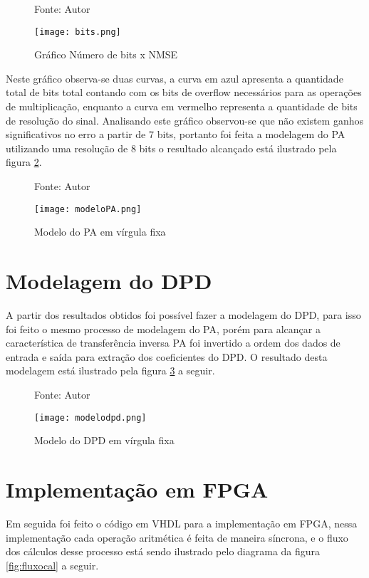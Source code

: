 \begin{figure}[htbp!]
    \centering
    \captionsetup{justification=centering}
    \caption*{Fonte: Autor}
    \texttt{[image: bits.png]}
    \caption{Gráfico Número de bits x NMSE}
    \label{fig:bits}
\end{figure}

Neste gráfico observa-se duas curvas, a curva em azul apresenta a quantidade total de bits total contando com os bits de overflow necessários para as operações de multiplicação, enquanto a curva em vermelho representa a quantidade de bits de resolução do sinal. Analisando este gráfico observou-se que não existem ganhos significativos no erro a partir de 7 bits, portanto foi feita a modelagem do PA utilizando uma resolução de 8 bits o resultado alcançado está ilustrado pela figura \ref{fig:modelopa}.

\begin{figure}[htbp!]
    \centering
    \captionsetup{justification=centering}
    \caption*{Fonte: Autor}
    \texttt{[image: modeloPA.png]}
    \caption{Modelo do PA em vírgula fixa}
    \label{fig:modelopa}
\end{figure}

\section{Modelagem do DPD}
A partir dos resultados obtidos foi possível fazer a modelagem do DPD, para isso foi feito o mesmo processo de modelagem do PA, porém para alcançar a característica de transferência inversa PA foi invertido a ordem dos dados de entrada e saída para extração dos coeficientes do DPD. O resultado desta modelagem está ilustrado pela figura \ref{fig:modelodpd} a seguir.

\begin{figure}[htbp!]
    \centering
    \captionsetup{justification=centering}
    \caption*{Fonte: Autor}
    \texttt{[image: modelodpd.png]}
    \caption{Modelo do DPD em vírgula fixa}
    \label{fig:modelodpd}
\end{figure}

\section{Implementação em FPGA}
Em seguida foi feito o código em VHDL para a implementação em FPGA, nessa implementação cada operação aritmética é feita de maneira síncrona, e o fluxo dos cálculos desse processo está sendo ilustrado pelo diagrama da figura \ref{fig:fluxocal} a seguir.

